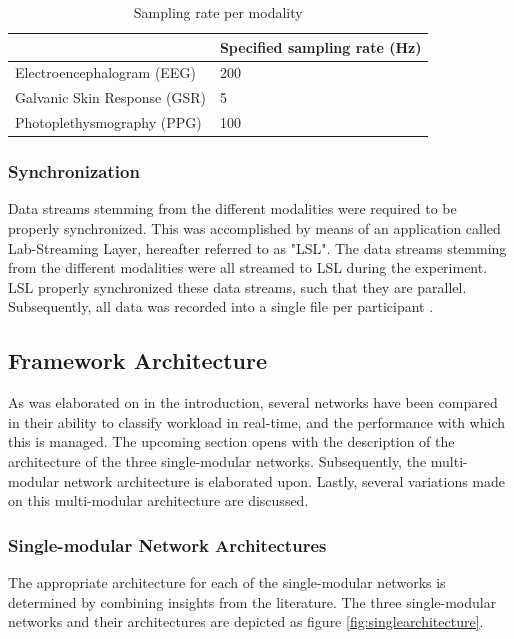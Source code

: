 \documentclass[12pt]{article}
\begin{document}
\bgroup
\def\arraystretch{1.6}%
\begin{table}[h]
\bigskip
\caption{Sampling rate per modality}
\label{table:samplingrate}
\begin{tabular}{ll}
    & Specified sampling rate (Hz) \\ \hline
 Electroencephalogram (EEG) & 200                         \\
Galvanic Skin Response (GSR) & 5                           \\
Photoplethysmography (PPG) & 100                         \\ \hline
\end{tabular}
\end{table}
\bigskip
\egroup

\subsubsection{Synchronization}
Data streams stemming from the different modalities were required to be properly synchronized. This was accomplished by means of an application called Lab-Streaming Layer, hereafter referred to as "LSL". The data streams stemming from the different modalities were all streamed to LSL during the experiment. LSL properly synchronized these data streams, such that they are parallel. Subsequently, all data was recorded into a single file per participant \cite{kothe2018lab}.

\newpage
\subsection{Framework Architecture}
As was elaborated on in the introduction, several networks have been compared in their ability to classify workload in real-time, and the performance with which this is managed. The upcoming section opens with the description of the architecture of the three single-modular networks. Subsequently, the multi-modular network architecture is elaborated upon. Lastly, several variations made on this multi-modular architecture are discussed. 

\subsubsection{Single-modular Network Architectures}
The appropriate architecture for each of the single-modular networks is determined by combining insights from the literature. The three single-modular networks and their architectures are depicted as figure \ref{fig:singlearchitecture}.
\end{document}
